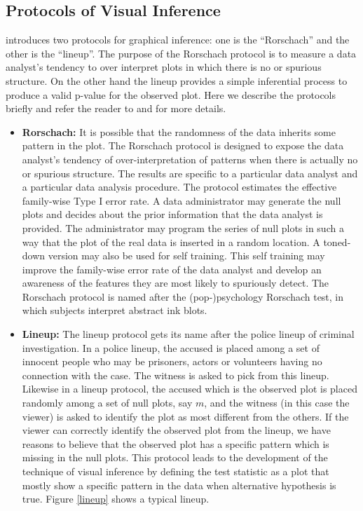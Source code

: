 \subsection{Protocols of Visual Inference} \label{sec:protocol} \citet{buja:2009} introduces two protocols for graphical inference: one is the  ``Rorschach'' and the other is the ``lineup''. The purpose of the Rorschach protocol is to measure a data analyst's tendency to over interpret plots in which there is no or spurious structure. On the other hand the lineup provides a simple inferential process to produce a valid p-value for the observed plot. Here we describe the protocols briefly and refer the reader to \citet{buja:2009} and \cite{hadley:2010} for more details. 

\begin{itemize}
\item {\bf Rorschach:} It is possible that the randomness of the data inherits some pattern in the plot. The Rorschach protocol is designed to expose the data analyst's tendency of over-interpretation of patterns when there is actually no or spurious structure. The results are specific to a particular data analyst and a particular data analysis procedure. The protocol estimates the effective family-wise Type I error rate. A data administrator may generate the null plots and decides about the prior information that the data analyst is provided. The administrator may program the series of null plots in such a way that the plot of the real data is inserted in a random location. A toned-down version may also be used for self training. This self training may improve the family-wise error rate of the data analyst and develop an awareness of the features they are most likely to spuriously detect. 
The Rorschach protocol is named after the (pop-)psychology Rorschach test, in which subjects interpret abstract ink blots. 

\item {\bf Lineup:} The lineup protocol gets its name after the police lineup of criminal investigation. In a police lineup, the accused is placed among a set of innocent people who may be prisoners, actors or volunteers having no connection with the case. The witness is asked to pick from this lineup. Likewise in a lineup protocol, the accused which is the observed plot is placed randomly among a set of null plots, say $m$, and the witness (in this case the viewer) is asked to identify the plot as most different from the others. If the viewer  can correctly identify the observed plot from the lineup, we have reasons to believe that the observed plot has a specific pattern which is missing in the null plots. This protocol leads to the development of the technique of visual inference by defining the test statistic as a plot that mostly show a specific pattern in the data when alternative hypothesis is true. Figure \ref{lineup} shows a typical lineup. 
\end{itemize}

